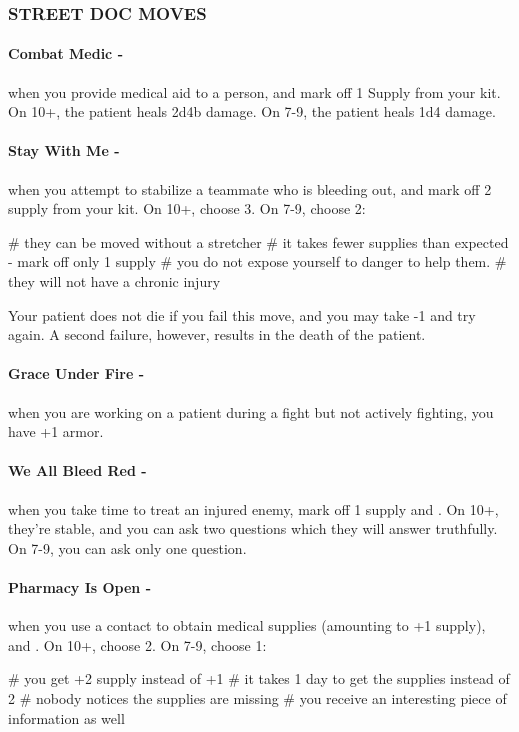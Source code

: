 \subsubsection{STREET DOC MOVES}
\paragraph{Combat Medic -} when you provide medical aid to a person,  and mark off 1 Supply from your kit. On 10+, the patient heals 2d4b damage. On 7-9, the patient heals 1d4 damage.

\paragraph{Stay With Me -} when you attempt to stabilize a teammate who is bleeding out,  and mark off 2 supply from your kit. On 10+, choose 3. On 7-9, choose 2:
    \begin{easylist}
        # they can be moved without a stretcher
        # it takes fewer supplies than expected - mark off only 1 supply
        # you do not expose yourself to danger to help them.
        # they will not have a chronic injury
    \end{easylist}
Your patient does not die if you fail this move, and you may take -1 and try again. A second failure, however, results in the death of the patient.

\paragraph{Grace Under Fire -} when you are working on a patient during a fight but not actively fighting, you have +1 armor.

\paragraph{We All Bleed Red -} when you take time to treat an injured enemy, mark off 1 supply and . On 10+, they’re stable, and you can ask two questions which they will answer truthfully. On 7-9, you can ask only one question.

\paragraph{Pharmacy Is Open -} when you use a contact to obtain medical supplies (amounting to +1 supply), and . On 10+, choose 2. On 7-9, choose 1:
    \begin{easylist}
        # you get +2 supply instead of +1
        # it takes 1 day to get the supplies instead of 2
        # nobody notices the supplies are missing
        # you receive an interesting piece of information as well
    \end{easylist}

